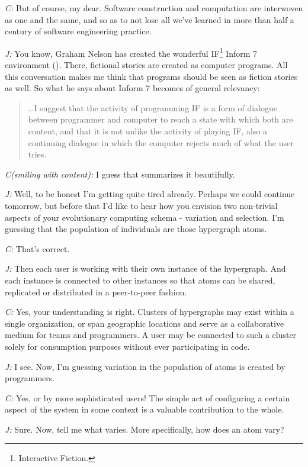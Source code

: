 \documentclass[10pt]{sigplanconf}
\begin{document}
\emph{C:} But of course, my dear. Software construction and computation are interwoven as one and the same, and so as to not lose all we've learned in more than half a century of software engineering practice.

\emph{J:} You know, Graham Nelson has created the wonderful IF\footnote{Interactive Fiction.} Inform 7 environment (\cite{nelson}). There, fictional stories are created as computer programs. All this conversation makes me think that programs should be seen as fiction stories as well. So what he says about Inform 7 becomes of general relevancy:

\begin{quote}
\ldots I suggest that the activity of programming IF is a form of dialogue between programmer and computer to reach a state with which both are content, and that it is not unlike the activity of playing IF, also a continuing dialogue in which the computer rejects much of what the user tries. 
\end{quote}

\emph{C(smiling with content):} I guess that summarizes it beautifully.

\emph{J:} Well, to be honest I'm getting quite tired already. Perhaps we could continue tomorrow, but before that I'd like to hear how you envision two non-trivial aspects of your evolutionary computing schema - variation and selection. I'm guessing that the population of individuals are those hypergraph atoms.

\emph{C:} That's correct.

\emph{J:} Then each user is working with their own instance of the hypergraph. And each instance is connected to other instances so that atoms can be shared, replicated or distributed in a peer-to-peer fashion.

\emph{C:} Yes, your understanding is right. Clusters of hypergraphs may exist within a single organization, or span geographic locations and serve as a collaborative medium for teams and programmers. A user may be connected to such a cluster solely for consumption purposes without ever participating in code.

\emph{J:} I see. Now, I'm guessing variation in the population of atoms is created by programmers.

\emph{C:} Yes, or by more sophisticated users! The simple act of configuring a certain aspect of the system in some context is a valuable contribution to the whole.

\emph{J:} Sure. Now, tell me what varies. More specifically, how does an atom vary?
\end{document}
